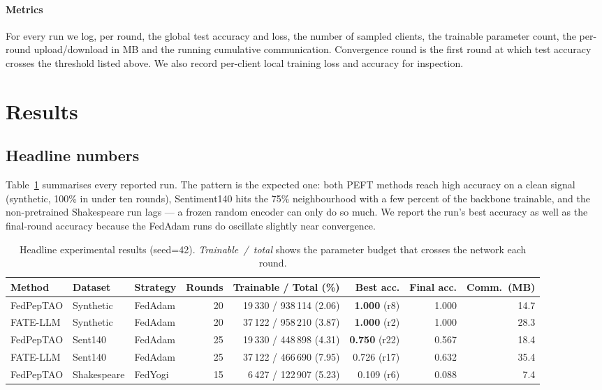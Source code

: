 \documentclass[journal]{IEEEtran}
\begin{document}
\paragraph{Metrics} For every run we log, per round, the global test
accuracy and loss, the number of sampled clients, the trainable parameter
count, the per-round upload/download in MB and the running cumulative
communication. Convergence round is the first round at which test accuracy
crosses the threshold listed above. We also record per-client local
training loss and accuracy for inspection.


\section{Results}
\label{sec:results}

\subsection{Headline numbers}
Table~\ref{tab:results} summarises every reported run. The pattern is the
expected one: both PEFT methods reach high accuracy on a clean signal
(synthetic, 100\% in under ten rounds), Sentiment140 hits the 75\%
neighbourhood with a few percent of the backbone trainable, and the
non-pretrained Shakespeare run lags --- a frozen random encoder can only
do so much. We report the run's best accuracy as well as the final-round
accuracy because the FedAdam runs do oscillate slightly near convergence.

\begin{table}[!t]
\renewcommand{\arraystretch}{1.15}
\caption{Headline experimental results (seed=42). \emph{Trainable~/~total}
shows the parameter budget that crosses the network each round.}
\label{tab:results}
\centering
\footnotesize
\begin{tabular}{lllrrrrr}
\toprule
Method & Dataset & Strategy & Rounds & Trainable / Total (\%) & Best acc. & Final acc. & Comm.~(MB)\\
\midrule
FedPepTAO  & Synthetic   & FedAdam   & 20 & 19\,330 / 938\,114 (2.06)  & \textbf{1.000} (r8)  & 1.000 & 14.7\\
FATE-LLM   & Synthetic   & FedAdam   & 20 & 37\,122 / 958\,210 (3.87)  & \textbf{1.000} (r2)  & 1.000 & 28.3\\
FedPepTAO  & Sent140     & FedAdam   & 25 & 19\,330 / 448\,898 (4.31)  & \textbf{0.750} (r22) & 0.567 & 18.4\\
FATE-LLM   & Sent140     & FedAdam   & 25 & 37\,122 / 466\,690 (7.95)  & 0.726 (r17)          & 0.632 & 35.4\\
FedPepTAO  & Shakespeare & FedYogi   & 15 & 6\,427 / 122\,907 (5.23)   & 0.109 (r6)           & 0.088 & 7.4\\
\bottomrule
\end{tabular}
\end{table}
\end{document}

